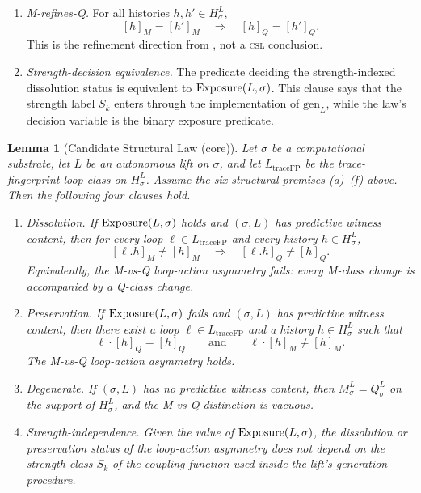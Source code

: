 \documentclass[11pt]{article}
\newcommand{\CSL}{\textsc{csl}}            \newcommand{\CSLcore}{Candidate Structural Law}
\newcommand{\Substrate}{\sigma}             \newcommand{\Lift}{L}                       \newcommand{\LiftState}{\sigma_{L}}         \newcommand{\HistorySpace}{H_{\Substrate}^{\Lift}}
\newcommand{\Qquotient}{Q_{\Substrate}^{\Lift}}
\newcommand{\Mquotient}{M_{\Substrate}^{\Lift}}
\newcommand{\Qclass}[1]{[#1]_{Q}}
\newcommand{\Mclass}[1]{[#1]_{M}}
\newcommand{\TraceFPLoopClass}{L_{\mathrm{traceFP}}}
\newcommand{\LoopActionQ}[2]{#1\cdot\Qclass{#2}}
\newcommand{\LoopActionM}[2]{#1\cdot\Mclass{#2}}
\newcommand{\StrengthClass}[1]{S_{#1}}
\newtheorem{lemma}[theorem]{Lemma}
\theoremstyle{definition}
\begin{document}
\begin{enumerate}[label=(\alph*)]
  \item \emph{M-refines-Q.}  For all histories \(h,h'\in\HistorySpace\),
  \[
    \Mclass{h}=\Mclass{h'}
    \quad\Longrightarrow\quad
    \Qclass{h}=\Qclass{h'} .
  \]
  This is the refinement direction from
  , not a \CSL{} conclusion.

  \item \emph{Strength-decision equivalence.}  The predicate deciding
  the strength-indexed dissolution status is equivalent to
  \(\Exposure(\Lift,\Substrate)\).  This clause says that the strength
  label \(\StrengthClass{k}\) enters through the implementation of
  \(\mathrm{gen}_{\Lift}\), while the law's decision variable is the
  binary exposure predicate.
\end{enumerate}

\begin{lemma}[\CSLcore{} (core)]
\label{lem:csl-core}
Let \(\Substrate\) be a computational substrate, let \(\Lift\) be an
autonomous lift on \(\Substrate\), and let \(\TraceFPLoopClass\) be
the trace-fingerprint loop class on \(\HistorySpace\).  Assume the six
structural premises (a)--(f) above.  Then the following four clauses
hold.
\begin{enumerate}
  \item \emph{Dissolution.}  If \(\Exposure(\Lift,\Substrate)\) holds
  and \((\Substrate,\Lift)\) has predictive witness content, then for
  every loop \(\ell\in\TraceFPLoopClass\) and every history
  \(h\in\HistorySpace\),
  \[
    \Mclass{\ell.h}\neq\Mclass{h}
    \quad\Longrightarrow\quad
    \Qclass{\ell.h}\neq\Qclass{h}.
  \]
  Equivalently, the M-vs-Q loop-action asymmetry fails: every
  M-class change is accompanied by a Q-class change.

  \item \emph{Preservation.}  If \(\Exposure(\Lift,\Substrate)\) fails
  and \((\Substrate,\Lift)\) has predictive witness content, then
  there exist a loop \(\ell\in\TraceFPLoopClass\) and a history
  \(h\in\HistorySpace\) such that
  \[
    \LoopActionQ{\ell}{h}=\Qclass{h}
    \qquad\text{and}\qquad
    \LoopActionM{\ell}{h}\neq\Mclass{h}.
  \]
  The M-vs-Q loop-action asymmetry holds.

  \item \emph{Degenerate.}  If \((\Substrate,\Lift)\) has no
  predictive witness content, then \(\Mquotient=\Qquotient\) on the
  support of \(\HistorySpace\), and the M-vs-Q distinction is vacuous.

  \item \emph{Strength-independence.}  Given the value of
  \(\Exposure(\Lift,\Substrate)\), the dissolution or preservation
  status of the loop-action asymmetry does not depend on the strength
  class \(\StrengthClass{k}\) of the coupling function used inside
  the lift's generation procedure.
\end{enumerate}
\end{lemma}
\end{document}
